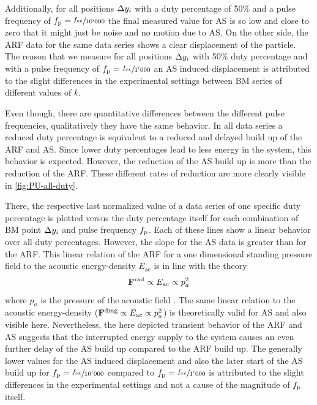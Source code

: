 Additionally, for all positions $\Delta y_{i}$ with a duty percentage of 50\% and a 
pulse frequency of $f_{\mathrm{p}}=\sfrac{f_{\mathrm{ex}}}{10`000}$ the final measured value for AS 
is so low and close to zero that it might just be noise and no motion due to 
AS. On the other side, the ARF data for the same data series shows a clear 
displacement of the particle. The reason that we measure for all positions 
$\Delta y_{i}$ with 50\% duty percentage and with a pulse frequency of 
$f_{\mathrm{p}}=\sfrac{f_{\mathrm{ex}}}{1'000}$ an AS induced displacement is attributed to the 
slight differences in the experimental settings between BM series of different 
values of $k$.

Even though, there are quantitative differences between the different pulse 
frequencies, qualitatively they have the same behavior. In all data series a 
reduced duty percentage is equivalent to a reduced and delayed build up of the 
ARF and AS. Since lower duty percentages lead to less energy in the system, 
this behavior is expected. However, the reduction of the AS build up is more 
than the reduction of the ARF. These different rates of reduction are more 
clearly visible in \cref{fig:PU-all-duty}.

There, the respective last normalized value of a data series of one specific 
duty percentage is plotted versus the duty percentage itself for each 
combination of BM point $\Delta y_{i}$ and pulse frequency $f_{\mathrm{p}}$. Each of these 
lines show a linear behavior over all duty percentages. However, the slope for 
the AS data is greater than for the ARF. This linear relation of the ARF for a 
one dimensional standing pressure field to the acoustic energy-density 
$E_{\mathrm{ac}}$ is in line with the theory
\begin{equation*}
  \vb{F}^{\mathrm{rad}}\propto E_{\mathrm{ac}} \propto p_{a}^{2}
\end{equation*}
where $p_{a}$ is the pressure of the acoustic field 
\cite{Gorkov1962,Bruus2012}. The same linear relation to the acoustic 
energy-density ($\vb{F}^{\mathrm{drag}}\propto E_{\mathrm{ac}}\propto p_{a}^{2}$) is 
theoretically valid for AS \cite{Bach2020} and also visible here. Nevertheless, 
the here depicted transient behavior of the ARF and AS suggests that the 
interrupted energy supply to the system causes an even further delay of the AS 
build up compared to the ARF build up. The generally lower values for the AS 
induced displacement and also the later start of the AS build up for 
$f_{\mathrm{p}}=\sfrac{f_{\mathrm{ex}}}{10'000}$ compared to $f_{\mathrm{p}}=\sfrac{f_{\mathrm{ex}}}{1'000}$ is attributed 
to the slight differences in the experimental settings and not a cause of the 
magnitude of $f_{\mathrm{p}}$ itself.

